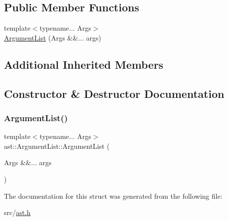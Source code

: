 \subsection*{Public Member Functions}
\begin{DoxyCompactItemize}
\item 
{\footnotesize template$<$typename... Args$>$ }\\\hyperlink{structast_1_1_argument_list_a88c8ac45de2ea2f210d272ea898f26c2}{Argument\+List} (Args \&\&... args)
\end{DoxyCompactItemize}
\subsection*{Additional Inherited Members}


\subsection{Constructor \& Destructor Documentation}
\mbox{\label{structast_1_1_argument_list_a88c8ac45de2ea2f210d272ea898f26c2}} 
\subsubsection{\texorpdfstring{Argument\+List()}{ArgumentList()}}
{\footnotesize\ttfamily template$<$typename... Args$>$ \\
ast\+::\+Argument\+List\+::\+Argument\+List (\begin{DoxyParamCaption}\item[{Args \&\&...}]{args }\end{DoxyParamCaption})\hspace{0.3cm}{\ttfamily [inline]}}



The documentation for this struct was generated from the following file\+:\begin{DoxyCompactItemize}
\item 
src/\hyperlink{ast_8h}{ast.\+h}\end{DoxyCompactItemize}
